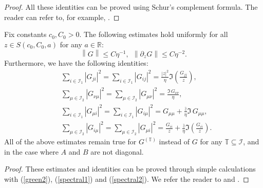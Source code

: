 \begin{proof}
All these identities can be proved using Schur's complement formula. The reader can refer to, for example, \cite[Lemma 4.4]{Anisotropic}.
\end{proof}

\begin{lemma}\label{Ward_id}
Fix constants $c_0,C_0>0$. The following estimates hold uniformly for all $z\in S(c_0,C_0,a)$ for any $a\in \mathbb R$:
\begin{equation}
\left\| G \right\| \le C\eta ^{ - 1} ,\ \ \left\| {\partial _z G} \right\| \le C\eta ^{ - 2}. \label{eq_gbound}
\end{equation}
Furthermore, we have the following identities:
\begin{align}
& \sum_{i \in \mathcal I_1 }  \left| {G_{j i} } \right|^2 = \sum_{i \in \mathcal I_1 }  \left| {G_{ij} } \right|^2  = \frac{|z|^2}{\eta}\Im\left(\frac{G_{jj}}{z}\right) ,  \label{eq_gsq2} \\
& \sum_{\mu  \in \mathcal I_2 } {\left| {G_{\nu \mu } } \right|^2 } = \sum_{\mu  \in \mathcal I_2 } {\left| {G_{\mu \nu} } \right|^2 }  = \frac{{\Im \, G_{\nu\nu} }}{\eta}, \label{eq_gsq1}\\ 
& \sum_{i \in \mathcal I_1 } {\left| {G_{\mu i} } \right|^2 } = \sum_{i \in \mathcal I_1 } {\left| {G_{i\mu} } \right|^2 } = {G}_{\mu \mu}  + \frac{\bar z}{\eta} \Im \, G_{\mu\mu} , \label{eq_gsq3} \\ 
&\sum_{\mu \in \mathcal I_2 } {\left| {G_{i \mu} } \right|^2 } = \sum_{\mu \in \mathcal I_2 } {\left| {G_{\mu i} } \right|^2 } =  \frac{{G}_{ii}}{z}  + \frac{\bar z}{\eta} \Im\left(\frac{{G_{ii} }}{z}\right) . \label{eq_gsq4} 
 \end{align}
All of the above estimates remain true for $G^{(\mathbb T)}$ instead of $G$ for any $\mathbb T \subseteq \mathcal I$, and in the case where $A$ and $B$ are not diagonal.
\label{lemma_Im}
\end{lemma}
\begin{proof}
These estimates and identities can be proved through simple calculations with (\ref{green2}), (\ref{spectral1}) and (\ref{spectral2}). We refer the reader to \cite[Lemma 4.6]{Anisotropic} and \cite[Lemma 3.5]{XYY_circular}.
\end{proof}

